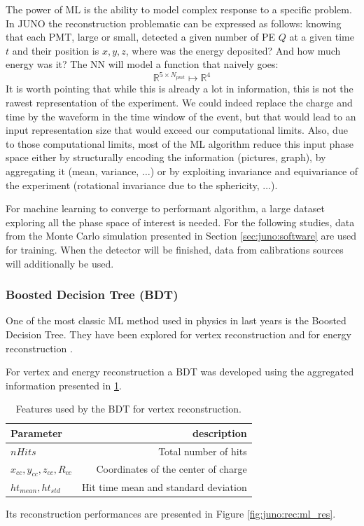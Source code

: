 \documentclass[../main.tex]{subfiles}
\begin{document}
The power of ML is the ability to model complex response to a specific problem. In JUNO the reconstruction problematic can be expressed as follows: knowing that each PMT, large or small, detected a given number of PE $Q$ at a given time $t$ and their position is $x,y,z$, where was the energy deposited? And how much energy was it? The NN will model a function that naively goes:
\begin{equation}
    \mathbb{R}^{5 \times N_{pmt}} \longmapsto \mathbb{R}^4
\end{equation}
It is worth pointing that while this is already a lot in information, this is not the rawest representation of the experiment. We could indeed replace the charge and time by the waveform in the time window of the event, but that would lead to an input representation size that would exceed our computational limits. Also, due to those computational limits, most of the ML algorithm reduce this input phase space either by structurally encoding the information (pictures, graph), by aggregating it (mean, variance, $\ldots$) or by exploiting invariance and equivariance of the experiment (rotational invariance due to the sphericity, $\ldots$).

For machine learning to converge to performant algorithm, a large dataset exploring all the phase space of interest is needed. For the following studies, data from the Monte Carlo simulation presented in Section \ref{sec:juno:software} are used for training. When the detector will be finished, data from calibrations sources will additionally be used.

\subsubsection{Boosted Decision Tree (BDT)}

One of the most classic ML method used in physics in last years is the Boosted Decision Tree. They have been explored for vertex reconstruction \cite{qian_vertex_2021} and for energy reconstruction \cite{qian_vertex_2021, gavrikov_energy_2022}.

For vertex and energy reconstruction a BDT was developed using the aggregated information presented in \ref{tab:juno:rec:bdt_vertex}.

\begin{table}[ht]
  \centering
  \begin{tabular}{l|r}
    Parameter & description \\
    \hline
    $nHits$ & Total number of hits \\
    $x_{cc}, y_{cc}, z_{cc}, R_{cc}$ & Coordinates of the center of charge \\
    $ht_{mean}, ht_{std}$ & Hit time mean and standard deviation
  \end{tabular}
  \caption{Features used by the BDT for vertex reconstruction.}
  \label{tab:juno:rec:bdt_vertex}
\end{table}
Its reconstruction performances are presented in Figure \ref{fig:juno:rec:ml_res}.
\end{document}
